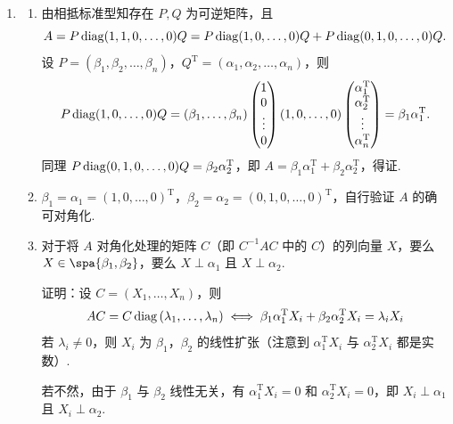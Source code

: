 \begin{enumerate}
    \item
    \begin{enumerate}
        \item 由相抵标准型知存在 \(P, Q\) 为可逆矩阵，且
        \[
            A = P \operatorname{diag}(1,1,0,\ldots, 0)Q = P\operatorname{diag}(1,0,\ldots, 0)Q + P\operatorname{diag}(0,1,0,\ldots, 0)Q.
        \]
        设 \(P = (\beta_{1}, \beta_{2}, \ldots, \beta_{n})\)，\(Q^\mathrm{T}=(\alpha_{1}, \alpha_{2}, \ldots, \alpha_{n})\)，则
        \[
            P\operatorname{diag}(1,0,\ldots, 0)Q=(\beta_{1}, \ldots, \beta_{n})\begin{pmatrix}
                1 \\
                0 \\
                \vdots \\
                0
            \end{pmatrix}(1,0,\ldots,0)
            \begin{pmatrix}
                \alpha_{1}^\mathrm{T} \\
                \alpha_{2}^\mathrm{T} \\
                \vdots \\
                \alpha_{n}^\mathrm{T}
            \end{pmatrix}=\beta_{1}\alpha_{1}^\mathrm{T}.
        \]
        同理 \(P\operatorname{diag}(0,1,0,\ldots, 0)Q=\beta_{2}\alpha_{2}^\mathrm{T}\)，即 \(A=\beta_{1}\alpha_{1}^\mathrm{T}+\beta_{2}\alpha_{2}^\mathrm{T}\)，得证.

        \item \(\beta_{1}=\alpha_{1}=(1,0,\ldots, 0)^\mathrm{T}\)，\(\beta_{2}=\alpha_{2}=(0,1,0,\ldots, 0)^\mathrm{T}\)，自行验证 \(A\) 的确可对角化.

        \item 对于将 \(A\) 对角化处理的矩阵 \(C\)（即 \(C^{-1}AC\) 中的 \(C\)）的列向量 \(X\)，要么 \(X \in \spa\{\beta_{1}, \beta_{2}\}\)，要么 \(X \perp \alpha_{1}\) 且 \(X \perp \alpha_{2}\).

        证明：设 \(C=(X_{1}, \ldots, X_{n})\)，则
        \[
        AC = C\operatorname{diag}\left(\lambda_{1}, \ldots, \lambda_{n}\right) \iff \beta_{1}\alpha_{1}^\mathrm{T}X_{i}+\beta_{2}\alpha_{2}^\mathrm{T}X_{i}=\lambda_{i}X_{i}
        \]
        若 \(\lambda_{i} \neq 0\)，则 \(X_{i}\) 为 \(\beta_{1}\)，\(\beta_{2}\) 的线性扩张（注意到 \(\alpha_{1}^\mathrm{T}X_{i}\) 与 \(\alpha_{2}^\mathrm{T}X_{i}\) 都是实数）.

        若不然，由于 \(\beta_{1}\) 与 \(\beta_{2}\) 线性无关，有 \(\alpha_{1}^\mathrm{T}X_{i}=0\) 和 \(\alpha_{2}^\mathrm{T}X_{i}=0\)，即 \(X_{i} \perp \alpha_{1}\) 且 \(X_{i} \perp \alpha_{2}\).
    \end{enumerate}


\end{enumerate}
